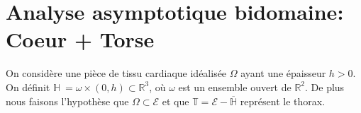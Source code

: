 \section{Analyse asymptotique bidomaine: Coeur + Torse}

On considère une pièce de tissu cardiaque idéalisée $\Omega$ ayant une épaisseur $h>0$. On définit $\mathbb{H}\ = \omega \times (0,h) \subset \mathbb{R}^3$, où $\omega$ est un ensemble ouvert de $\mathbb{R}^2$. De plus nous faisons l'hypothèse que $\Omega \subset \mathcal{E}$ et que $\mathbb{T} = \mathcal{E} - \mathbb{\overline{H}}$ représent le thorax.  


